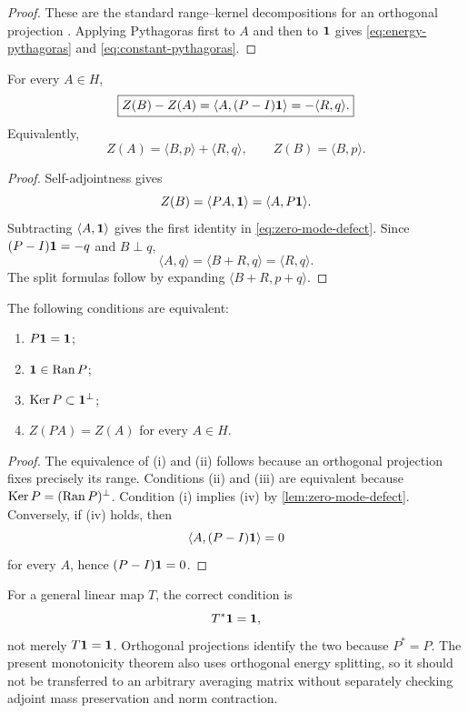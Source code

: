 \begin{proof}
These are the standard range--kernel decompositions for an
orthogonal projection \citep[Chapter I]{Bhatia1997}.  Applying
Pythagoras first to \(A\) and then to \(\mathbf 1\) gives
\eqref{eq:energy-pythagoras} and
\eqref{eq:constant-pythagoras}.
\end{proof}

\begin{lemma}
\label{lem:zero-mode-defect}
For every \(A\in H\),
\begin{equation}
 \boxed{
 Z(B)-Z(A)
 =
 \langle A,(P-I)\mathbf 1\rangle
 =
 -\langle R,q\rangle.}
\label{eq:zero-mode-defect}
\end{equation}
Equivalently,
\begin{equation}
 Z(A)=\langle B,p\rangle+\langle R,q\rangle,
\qquad
 Z(B)=\langle B,p\rangle.
\label{eq:split-zero-mode}
\end{equation}
\end{lemma}

\begin{proof}
Self-adjointness gives
\[
 Z(B)=\langle PA,\mathbf 1\rangle
 =\langle A,P\mathbf 1\rangle.
\]
Subtracting \(\langle A,\mathbf 1\rangle\) gives the first identity in
\eqref{eq:zero-mode-defect}.  Since
\((P-I)\mathbf 1=-q\) and \(B\perp q\),
\[
 \langle A,q\rangle
 =\langle B+R,q\rangle
 =\langle R,q\rangle.
\]
The split formulas follow by expanding
\(\langle B+R,p+q\rangle\).
\end{proof}

\begin{proposition}
\label{prop:preservation-criterion}
The following conditions are equivalent:
\begin{enumerate}[label=(\roman*),leftmargin=2.2em]
\item \(P\mathbf 1=\mathbf 1\);
\item \(\mathbf 1\in\operatorname{Ran} P\);
\item \(\operatorname{Ker} P\subset\mathbf 1^\perp\);
\item \(Z(PA)=Z(A)\) for every \(A\in H\).
\end{enumerate}
\end{proposition}

\begin{proof}
The equivalence of (i) and (ii) follows because an orthogonal
projection fixes precisely its range.  Conditions (ii) and (iii)
are equivalent because \(\operatorname{Ker} P=(\operatorname{Ran} P)^\perp\).  Condition (i)
implies (iv) by \cref{lem:zero-mode-defect}.  Conversely, if (iv)
holds, then
\[
 \langle A,(P-I)\mathbf 1\rangle=0
\]
for every \(A\), hence \((P-I)\mathbf 1=0\).
\end{proof}

\begin{remark}
\label{rem:general-operators}
For a general linear map \(T\), the correct condition is
\[
 T^\ast\mathbf 1=\mathbf 1,
\]
not merely \(T\mathbf 1=\mathbf 1\).  Orthogonal projections identify the two
because \(P^\ast=P\).  The present monotonicity theorem also uses
orthogonal energy splitting, so it should not be transferred to an
arbitrary averaging matrix without separately checking adjoint
mass preservation and norm contraction.
\end{remark}
